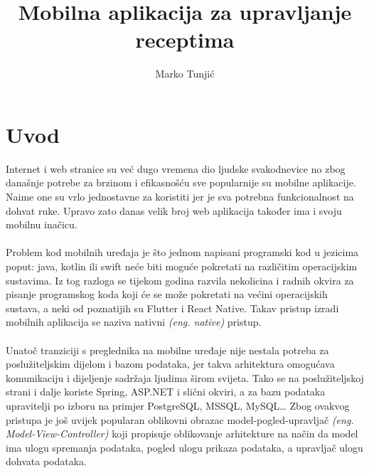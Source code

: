 \documentclass[times, utf8, zavrsni]{fer}
\begin{document}

\title{Mobilna aplikacija za upravljanje receptima}

\author{Marko Tunjić}

\maketitle

\zahvala{}

\tableofcontents

\chapter{Uvod}
Internet i web stranice su već dugo vremena dio ljudske svakodnevice no zbog
današnje potrebe za brzinom i efikasnošću sve popularnije su mobilne aplikacije. Naime one
su vrlo jednostavne za koristiti jer je sva potrebna funkcionalnost na dohvat ruke.
Upravo zato danas velik broj web aplikacija
također ima i svoju mobilnu inačicu.
\\\\
Problem kod mobilnih uređaja je što jednom napisani programski kod u jezicima poput:
java, kotlin ili swift neće biti moguće pokretati na različitim operacijskim sustavima.
Iz tog razloga se tijekom godina razvila nekolicina
i radnih okvira za pisanje programskog koda koji će se može pokretati
na većini operacijskih sustava, a neki od poznatijih su Flutter i React Native.
Takav pristup izradi mobilnih aplikacija se naziva nativni \textit{(eng. native)} pristup.
\\\\
Unatoč tranziciji s preglednika na mobilne uređaje nije nestala potreba
za poslužiteljskim dijelom i bazom podataka, jer takva arhitektura omogućava
komunikaciju i dijeljenje sadržaja ljudima širom svijeta. Tako se na
poslužiteljskoj strani i dalje koriste Spring, ASP.NET i slični okviri,
a za bazu podataka upravitelji po izboru na primjer PostgreSQL, MSSQL, MySQL\dots
Zbog ovakvog pristupa je još uvijek popularan oblikovni obrazac model-pogled-upravljač \textit{(eng. Model-View-Controller)}
koji propisuje oblikovanje arhitekture na način da model ima ulogu
spremanja podataka, pogled ulogu prikaza podataka, a upravljač ulogu dohvata podataka.
\\\\
\end{document}
